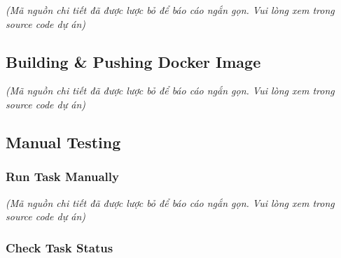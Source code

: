 \emph{(Mã nguồn chi tiết đã được lược bỏ để báo cáo ngắn gọn. Vui lòng
xem trong source code dự án)}

\hypertarget{building-pushing-docker-image}{%
\subsection{Building \& Pushing Docker
Image}}

\emph{(Mã nguồn chi tiết đã được lược bỏ để báo cáo ngắn gọn. Vui lòng
xem trong source code dự án)}

\hypertarget{manual-testing}{%
\subsection{Manual Testing}}

\hypertarget{run-task-manually}{%
\subsubsection{Run Task Manually}}

\emph{(Mã nguồn chi tiết đã được lược bỏ để báo cáo ngắn gọn. Vui lòng
xem trong source code dự án)}

\hypertarget{check-task-status}{%
\subsubsection{Check Task Status}}

\begin{Shaded}
\begin{Highlighting}[]
    

\OperatorTok{=}\VariableTok{$(}      \VariableTok{)}
   

  
\end{Highlighting}
\end{Shaded}

